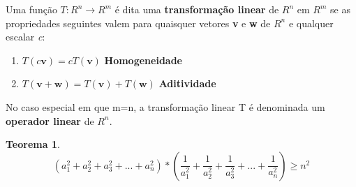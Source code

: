 \documentclass[a4paper]{article}
\newtheorem{theorem}{Teorema}[section]
\newenvironment{definition}[1][Definição]{\begin{trivlist}
\item[\hskip \labelsep {\bfseries #1}]}{\end{trivlist}}
\begin{document}
\begin{definition}
Uma função $T:R^n \longrightarrow R^m$ é dita uma \textbf{transformação linear} de $R^n$ em $R^m$ se as propriedades seguintes valem para quaisquer vetores \textbf{v} e \textbf{w} de $R^n$ e qualquer escalar \textit{c}:
\begin{enumerate}[label=\roman*]
\item $T(c\textbf{v})=cT(\textbf{v})$ \textbf{Homogeneidade}
\item $T(\textbf{v}+\textbf{w})= T(\textbf{v}) + T(\textbf{w})$ \textbf{Aditividade}
\end{enumerate}
No caso especial em que m=n, a transformação linear T é denominada um \textbf{operador linear} de $R^n$.
\end{definition}

\begin{theorem}
\label{Desigualdade_Quadrados_Inversos}
$$
(a^2_1+a^2_2+a^2_3+ ... +a^2_n) \ast \left(\frac{1}{a^2_1}+\frac{1}{a^2_2}+\frac{1}{a^2_3}+ ... + \frac{1}{a^2_n}\right) \geq n^2
$$
\end{theorem}


\end{document}
